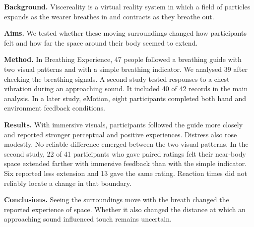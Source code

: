 \textbf{Background.} Viscereality is a virtual reality system in which a field of particles expands as the wearer breathes in and contracts as they breathe out.

\textbf{Aims.} We tested whether these moving surroundings changed how participants felt and how far the space around their body seemed to extend.

\textbf{Method.} In Breathing Experience, 47 people followed a breathing guide with two visual patterns and with a simple breathing indicator. We analysed 39 after checking the breathing signals. A second study tested responses to a chest vibration during an approaching sound. It included 40 of 42 records in the main analysis. In a later study, eMotion, eight participants completed both hand and environment feedback conditions.

\textbf{Results.} With immersive visuals, participants followed the guide more closely and reported stronger perceptual and positive experiences. Distress also rose modestly. No reliable difference emerged between the two visual patterns. In the second study, 22 of 41 participants who gave paired ratings felt their near-body space extended farther with immersive feedback than with the simple indicator. Six reported less extension and 13 gave the same rating. Reaction times did not reliably locate a change in that boundary.

\textbf{Conclusions.} Seeing the surroundings move with the breath changed the reported experience of space. Whether it also changed the distance at which an approaching sound influenced touch remains uncertain.
